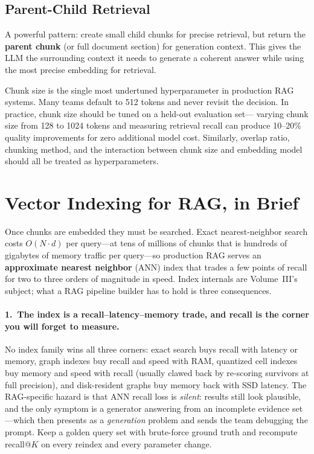 \subsection{Parent-Child Retrieval}

A powerful pattern: create small child chunks for precise retrieval, but
return the \textbf{parent chunk} (or full document section) for generation
context.  This gives the LLM the surrounding context it needs to generate
a coherent answer while using the most precise embedding for retrieval.

\begin{warningbox}
Chunk size is the single most undertuned hyperparameter in production RAG
systems.  Many teams default to 512 tokens and never revisit the decision.
In practice, chunk size should be tuned on a held-out evaluation set---
varying chunk size from 128 to 1024 tokens and measuring retrieval recall
can produce 10--20\% quality improvements for zero additional model cost.
Similarly, overlap ratio, chunking method, and the interaction between chunk
size and embedding model should all be treated as hyperparameters.
\end{warningbox}


\section{Vector Indexing for RAG, in Brief}
\label{sec:vector-db}

Once chunks are embedded they must be searched.  Exact nearest-neighbor search
costs $O(N \cdot d)$ per query---at tens of millions of chunks that is hundreds
of gigabytes of memory traffic per query---so production RAG serves an
\textbf{approximate nearest neighbor} (ANN) index that trades a few points of
recall for two to three orders of magnitude in speed.  Index internals are
Volume~III's subject; what a RAG pipeline builder has to hold is three
consequences.

\paragraph{1.\ The index is a recall--latency--memory trade, and recall is the
corner you will forget to measure.}
No index family wins all three corners: exact search buys recall with latency
or memory, graph indexes buy recall and speed with RAM, quantized cell indexes
buy memory and speed with recall (usually clawed back by re-scoring survivors
at full precision), and disk-resident graphs buy memory back with SSD latency.
The RAG-specific hazard is that ANN recall loss is \emph{silent}: results still
look plausible, and the only symptom is a generator answering from an
incomplete evidence set---which then presents as a \emph{generation} problem
and sends the team debugging the prompt.  Keep a golden query set with
brute-force ground truth and recompute recall@$K$ on every reindex and every
parameter change.

